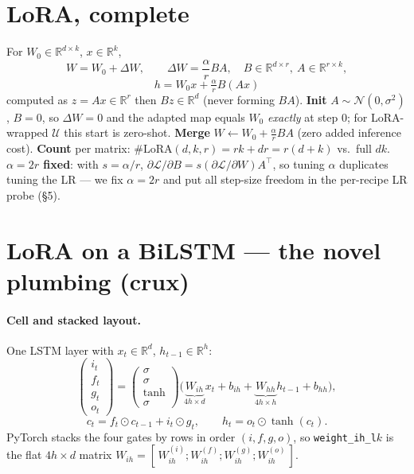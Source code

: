 \documentclass[11pt]{article}
\newcommand{\code}[1]{\texttt{#1}}
\begin{document}
\section{LoRA, complete}
For $W_0\in\mathbb R^{d\times k}$, $x\in\mathbb R^{k}$,
\[
W=W_0+\Delta W,\qquad \Delta W=\frac{\alpha}{r}BA,\quad B\in\mathbb R^{d\times r},\
A\in\mathbb R^{r\times k},
\]
\[
\boxed{\,h=W_0x+\tfrac{\alpha}{r}B(Ax)\,}
\]
computed as $z=Ax\in\mathbb R^r$ then $Bz\in\mathbb R^d$ (never forming $BA$).
\textbf{Init} $A\sim\mathcal N(0,\sigma^2)$, $B=0$, so $\Delta W=0$ and the adapted map
equals $W_0$ \emph{exactly} at step $0$; for LoRA-wrapped $\mathcal U$ this start is
zero-shot. \textbf{Merge} $W\leftarrow W_0+\frac{\alpha}{r}BA$ (zero added inference cost).
\textbf{Count} per matrix: $\#\mathrm{LoRA}(d,k,r)=rk+dr=r(d+k)$ vs.\ full $dk$.
\textbf{$\alpha=2r$ fixed}: with $s=\alpha/r$, $\partial\mathcal L/\partial
B=s(\partial\mathcal L/\partial W)A^\top$, so tuning $\alpha$ duplicates tuning the LR ---
we fix $\alpha=2r$ and put all step-size freedom in the per-recipe LR probe (\S5).

\section{LoRA on a BiLSTM --- the novel plumbing (crux)}

\paragraph{Cell and stacked layout.} One LSTM layer with $x_t\in\mathbb R^d$,
$h_{t-1}\in\mathbb R^h$:
\[
\begin{pmatrix} i_t\\ f_t\\ g_t\\ o_t \end{pmatrix}
=\begin{pmatrix}\sigma\\\sigma\\\tanh\\\sigma\end{pmatrix}\!
\Big(\underbrace{W_{ih}}_{4h\times d}x_t+b_{ih}+\underbrace{W_{hh}}_{4h\times h}h_{t-1}+b_{hh}\Big),
\]
\[
c_t=f_t\odot c_{t-1}+i_t\odot g_t,\qquad h_t=o_t\odot\tanh(c_t).
\]
PyTorch stacks the four gates by rows in order $(i,f,g,o)$, so \code{weight\_ih\_l}$k$ is
the flat $4h\times d$ matrix $W_{ih}=[\,W_{ih}^{(i)};W_{ih}^{(f)};W_{ih}^{(g)};W_{ih}^{(o)}\,]$.
\end{document}
